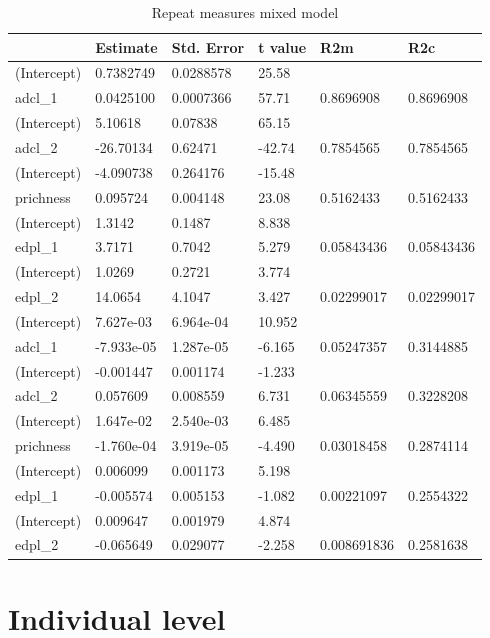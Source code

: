 \documentclass{article}
\begin{document}
\begin{table}[ht]
\caption{Repeat measures mixed model}
\begin{tabular}{llllll}
\hline
           & Estimate &Std. Error &t value &R2m&R2c \\
           \hline
(Intercept)&0.7382749 & 0.0288578 &  25.58 & & \\
adcl_1     &0.0425100 & 0.0007366 &  57.71 &0.8696908	&0.8696908\\
(Intercept)&  5.10618 &   0.07838 &  65.15&  & \\
adcl_2     &-26.70134 &   0.62471 & -42.74 &0.7854565	&0.7854565\\
(Intercept)&-4.090738 &  0.264176 & -15.48& & \\
prichness  & 0.095724 &  0.004148 &  23.08 &0.5162433	&0.5162433\\
(Intercept)&  1.3142  &   0.1487  & 8.838& & \\
edpl_1     &  3.7171  &   0.7042  & 5.279 &0.05843436	&0.05843436\\
(Intercept)&  1.0269  &   0.2721  & 3.774& & \\
edpl_2     & 14.0654  &   4.1047  & 3.427 &0.02299017	&0.02299017\\
(Intercept)& 7.627e-03&  6.964e-04&  10.952& & \\
adcl_1     &-7.933e-05&  1.287e-05&  -6.165&0.05247357	&0.3144885\\
(Intercept)&-0.001447 &  0.001174 & -1.233& & \\
adcl_2     & 0.057609 &  0.008559 &  6.731 &0.06345559	&0.3228208\\
(Intercept)& 1.647e-02&  2.540e-03&   6.485& & \\
prichness  &-1.760e-04&  3.919e-05&  -4.490& 0.03018458	&0.2874114\\
(Intercept)& 0.006099 &  0.001173 &  5.198& & \\
edpl_1     &-0.005574 &  0.005153 & -1.082 &0.00221097	&0.2554322\\
(Intercept)& 0.009647 &  0.001979 &  4.874& & \\
edpl_2     &-0.065649 &  0.029077 & -2.258&0.008691836	&0.2581638\\
\hline
\end{tabular}
\label{Tab:correall}
\end{table}

\section{Individual level}
\end{document}
